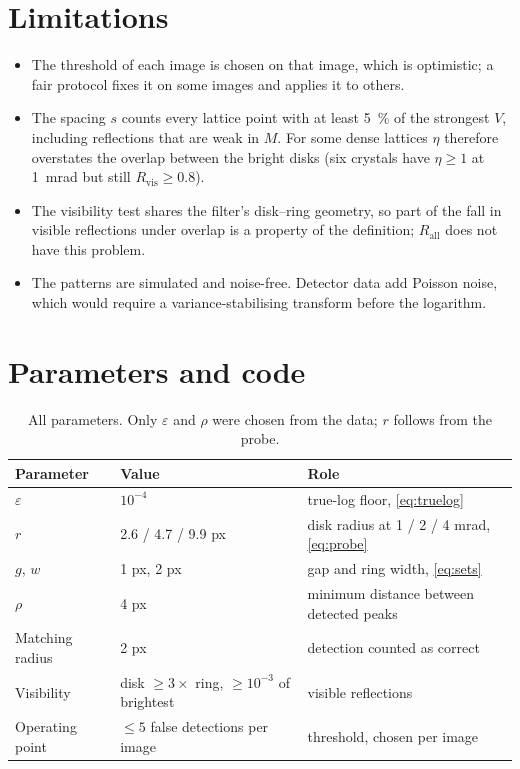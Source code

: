 \documentclass[11pt,a4paper]{article}
\newcommand{\Rvis}{R_{\mathrm{vis}}}
\newcommand{\Rall}{R_{\mathrm{all}}}
\begin{document}
\section{Limitations}
\begin{itemize}
  \item The threshold of each image is chosen on that image, which is optimistic; a fair protocol fixes it on some images
        and applies it to others.
  \item The spacing $s$ counts every lattice point with at least \SI{5}{\percent} of the strongest $V$, including
        reflections that are weak in $M$. For some dense lattices $\eta$ therefore overstates the overlap between the bright
        disks (six crystals have $\eta \ge 1$ at \SI{1}{\milli\radian} but still $\Rvis \ge 0.8$).
  \item The visibility test shares the filter's disk--ring geometry, so part of the fall in visible reflections under
        overlap is a property of the definition; $\Rall$ does not have this problem.
  \item The patterns are simulated and noise-free. Detector data add Poisson noise, which would require a
        variance-stabilising transform before the logarithm.
\end{itemize}

\appendix
\section{Parameters and code}
\begin{table}[!htbp]
  \centering
  \caption{All parameters. Only $\varepsilon$ and $\rho$ were chosen from the data; $r$ follows from the probe.}
  \label{tab:params}
  \small
  \begin{tabular}{lll}
    \toprule
    Parameter & Value & Role \\
    \midrule
    $\varepsilon$   & $10^{-4}$ & true-log floor, \cref{eq:truelog} \\
    $r$             & 2.6 / 4.7 / 9.9 px & disk radius at 1 / 2 / 4 mrad, \cref{eq:probe} \\
    $g$, $w$        & 1 px, 2 px & gap and ring width, \cref{eq:sets} \\
    $\rho$          & 4 px & minimum distance between detected peaks \\
    Matching radius & 2 px & detection counted as correct \\
    Visibility      & disk $\ge 3\times$ ring, $\ge 10^{-3}$ of brightest & visible reflections \\
    Operating point & $\le 5$ false detections per image & threshold, chosen per image \\
    \bottomrule
  \end{tabular}
\end{table}
\end{document}
